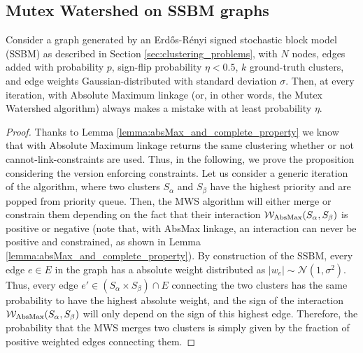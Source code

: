 \subsection{Mutex Watershed on SSBM graphs}
\begin{prop} \label{prop:MWS_on_SSBM}
Consider a graph generated by an Erd\H os-R\'enyi signed stochastic block model (SSBM) as described in Section \ref{sec:clustering_problems}, with $N$ nodes, edges added with probability $p$, sign-flip probability $\eta<0.5$, $k$ ground-truth clusters, and edge weights Gaussian-distributed with standard deviation $\sigma$. Then, at every iteration, \algname{} with Absolute Maximum linkage (or, in other words, the Mutex Watershed algorithm) always makes a mistake with at least probability $\eta$. 
\end{prop}
\begin{proof}
Thanks to Lemma \ref{lemma:absMax_and_complete_property} we know that \algname{} with Absolute Maximum linkage returns the same clustering whether or not cannot-link-constraints are used. Thus, in the following, we prove the proposition considering the version enforcing constraints.
Let us consider a generic iteration of the algorithm, where two clusters $S_\alpha$ and $S_\beta$ have the highest priority and are popped from priority queue. Then, the MWS algorithm will either merge or constrain them depending on the fact that their interaction $\mathcal{W}_{\mathrm{AbsMax}}(S_\alpha,S_\beta)$ is  positive or negative (note that, with AbsMax linkage, an interaction can never be positive and constrained, as shown in Lemma \ref{lemma:absMax_and_complete_property}).
By construction of the SSBM, every edge $e\in E$ in the graph has a absolute weight distributed as $|w_e|\sim \mathcal{N}(1,\sigma^2)$. Thus, every edge $e'\in(S_{\alpha} \times S_{\beta})\cap E$ connecting the two clusters has the same probability to have the highest absolute weight, and the sign of the interaction $\mathcal{W}_{\mathrm{AbsMax}}(S_\alpha,S_\beta)$ will only depend on the sign of this highest edge. Therefore, the probability that the MWS merges two clusters is simply given by the fraction of positive weighted edges connecting them.


\end{proof}

